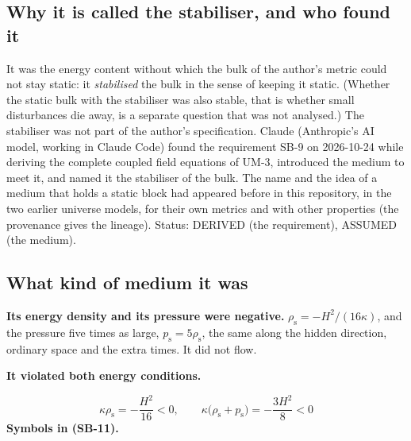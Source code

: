 \documentclass[
  10pt,
]{article}
\begin{document}
\hypertarget{why-it-is-called-the-stabiliser-and-who-found-it}{%
\subsection{Why it is called the stabiliser, and who found
it}\label{why-it-is-called-the-stabiliser-and-who-found-it}}

It was the energy content without which the bulk of the author's metric
could not stay static: it \emph{stabilised} the bulk in the sense of
keeping it static. (Whether the static bulk with the stabiliser was also
stable, that is whether small disturbances die away, is a separate
question that was not analysed.) The stabiliser was not part of the
author's specification. Claude (Anthropic's AI model, working in Claude
Code) found the requirement SB-9 on 2026-10-24 while deriving the
complete coupled field equations of UM-3, introduced the medium to meet
it, and named it the stabiliser of the bulk. The name and the idea of a
medium that holds a static block had appeared before in this repository,
in the two earlier universe models, for their own metrics and with other
properties (the provenance gives the lineage). Status: DERIVED (the
requirement), ASSUMED (the medium).

\hypertarget{what-kind-of-medium-it-was}{%
\subsection{What kind of medium it
was}\label{what-kind-of-medium-it-was}}

\textbf{Its energy density and its pressure were negative.}
\(\rho_{\mathrm{s}} = -H^2/(16\kappa)\), and the pressure five times as
large, \(p_{\mathrm{s}} = 5\rho_{\mathrm{s}}\), the same along the
hidden direction, ordinary space and the extra times. It did not flow.

\textbf{It violated both energy conditions.}

\[
\kappa\rho_{\mathrm{s}} = -\frac{H^2}{16} < 0,\qquad \kappa\big(\rho_{\mathrm{s}} + p_{\mathrm{s}}\big) = -\frac{3H^2}{8} < 0 \tag{SB-11}
\] \textbf{Symbols in (SB-11).}
\end{document}
